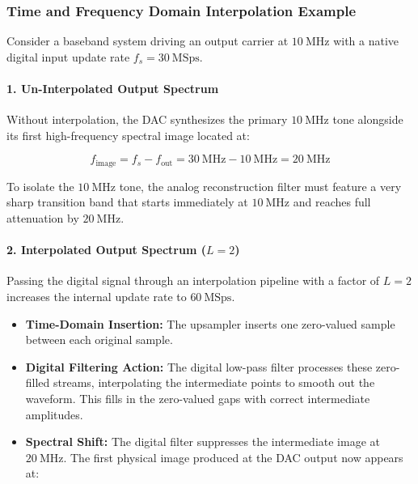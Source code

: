 \documentclass[
]{article}
\providecommand{\tightlist}{%
  \setlength{\itemsep}{0pt}\setlength{\parskip}{0pt}}
\begin{document}
\subsubsection{Time and Frequency Domain Interpolation
Example}\label{time-and-frequency-domain-interpolation-example}

Consider a baseband system driving an output carrier at
\(10\ \text{MHz}\) with a native digital input update rate
\(f_s = 30\ \text{MSps}\).

\paragraph{1. Un-Interpolated Output
Spectrum}\label{un-interpolated-output-spectrum}

Without interpolation, the DAC synthesizes the primary
\(10\ \text{MHz}\) tone alongside its first high-frequency spectral
image located at:

\[f_{\text{image}} = f_s - f_{\text{out}} = 30\ \text{MHz} - 10\ \text{MHz} = 20\ \text{MHz}\]

To isolate the \(10\ \text{MHz}\) tone, the analog reconstruction filter
must feature a very sharp transition band that starts immediately at
\(10\ \text{MHz}\) and reaches full attenuation by \(20\ \text{MHz}\).

\paragraph{\texorpdfstring{2. Interpolated Output Spectrum
(\(L=2\))}{2. Interpolated Output Spectrum (L=2)}}\label{interpolated-output-spectrum-l2}

Passing the digital signal through an interpolation pipeline with a
factor of \(L=2\) increases the internal update rate to
\(60\ \text{MSps}\).

\begin{itemize}
\tightlist
\item
  \textbf{Time-Domain Insertion:} The upsampler inserts one zero-valued
  sample between each original sample.
\item
  \textbf{Digital Filtering Action:} The digital low-pass filter
  processes these zero-filled streams, interpolating the intermediate
  points to smooth out the waveform. This fills in the zero-valued gaps
  with correct intermediate amplitudes.
\item
  \textbf{Spectral Shift:} The digital filter suppresses the
  intermediate image at \(20\ \text{MHz}\). The first physical image
  produced at the DAC output now appears at:
\end{itemize}
\end{document}
